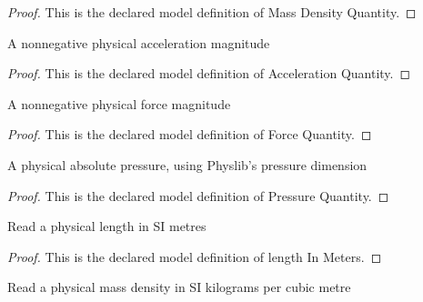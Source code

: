 \begin{proof}
  This is the declared model definition of Mass Density Quantity.
\end{proof}
\begin{definition}
  \label{def:physics:phyx-mini-0392:phyxminiproblems-problemphyxmini0392-accelerationquantity}
  A nonnegative physical acceleration magnitude
\end{definition}
\begin{proof}
  This is the declared model definition of Acceleration Quantity.
\end{proof}
\begin{definition}
  \label{def:physics:phyx-mini-0392:phyxminiproblems-problemphyxmini0392-forcequantity}
  A nonnegative physical force magnitude
\end{definition}
\begin{proof}
  This is the declared model definition of Force Quantity.
\end{proof}
\begin{definition}
  \label{def:physics:phyx-mini-0392:phyxminiproblems-problemphyxmini0392-pressurequantity}
  A physical absolute pressure, using Physlib's pressure dimension
\end{definition}
\begin{proof}
  This is the declared model definition of Pressure Quantity.
\end{proof}
\begin{definition}
  \label{def:physics:phyx-mini-0392:phyxminiproblems-problemphyxmini0392-lengthinmeters}
  Read a physical length in SI metres
\end{definition}
\begin{proof}
  This is the declared model definition of length In Meters.
\end{proof}
\begin{definition}
  \label{def:physics:phyx-mini-0392:phyxminiproblems-problemphyxmini0392-massdensityinkilogramspercubicmeter}
  Read a physical mass density in SI kilograms per cubic metre
\end{definition}
